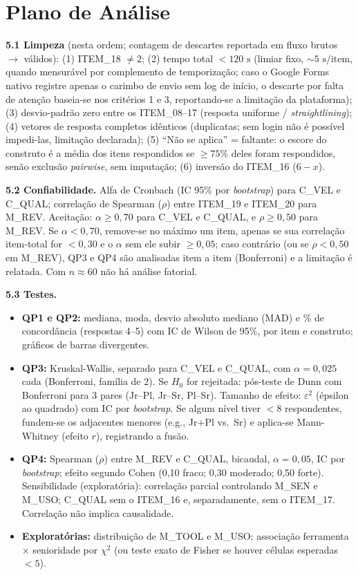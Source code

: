 \section{Plano de Análise}

\textbf{5.1 Limpeza} (nesta ordem; contagem de descartes reportada em fluxo brutos $\to$ válidos): (1) ITEM\_18 $\neq 2$; (2) tempo total $< 120\text{ s}$ (limiar fixo, $\sim 5\text{ s/item}$, quando mensurável por complemento de temporização; caso o Google Forms nativo registre apenas o carimbo de envio sem log de início, o descarte por falta de atenção baseia-se nos critérios 1 e 3, reportando-se a limitação da plataforma); (3) desvio-padrão zero entre os ITEM\_08--17 (resposta uniforme / \textit{straightlining}); (4) vetores de resposta completos idênticos (duplicatas; sem login não é possível impedi-las, limitação declarada); (5) \enquote{Não se aplica} = faltante: o escore do construto é a média dos itens respondidos se $\ge 75\%$ deles foram respondidos, senão exclusão \textit{pairwise}, sem imputação; (6) inversão do ITEM\_16 ($6 - x$).

\textbf{5.2 Confiabilidade.} Alfa de Cronbach (IC 95\% por \textit{bootstrap}) para C\_VEL e C\_QUAL; correlação de Spearman ($\rho$) entre ITEM\_19 e ITEM\_20 para M\_REV. Aceitação: $\alpha \ge 0{,}70$ para C\_VEL e C\_QUAL, e $\rho \ge 0{,}50$ para M\_REV. Se $\alpha < 0{,}70$, remove-se no máximo um item, apenas se sua correlação item-total for $< 0{,}30$ e o $\alpha$ sem ele subir $\ge 0{,}05$; caso contrário (ou se $\rho < 0{,}50$ em M\_REV), QP3 e QP4 são analisadas item a item (Bonferroni) e a limitação é relatada. Com $n \approx 60$ não há análise fatorial.

\textbf{5.3 Testes.}
\begin{itemize}
  \item \textbf{QP1 e QP2:} mediana, moda, desvio absoluto mediano (MAD) e \% de concordância (respostas 4--5) com IC de Wilson de 95\%, por item e construto; gráficos de barras divergentes.
  \item \textbf{QP3:} Kruskal-Wallis, separado para C\_VEL e C\_QUAL, com $\alpha = 0{,}025$ cada (Bonferroni, família de 2). Se $H_0$ for rejeitada: pós-teste de Dunn com Bonferroni para 3 pares (Jr--Pl, Jr--Sr, Pl--Sr). Tamanho de efeito: $\varepsilon^2$ (épsilon ao quadrado) com IC por \textit{bootstrap}. Se algum nível tiver $< 8$ respondentes, fundem-se os adjacentes menores (e.g., Jr+Pl vs.\ Sr) e aplica-se Mann-Whitney (efeito $r$), registrando a fusão.
  \item \textbf{QP4:} Spearman ($\rho$) entre M\_REV e C\_QUAL, bicaudal, $\alpha = 0{,}05$, IC por \textit{bootstrap}; efeito segundo Cohen (0,10 fraco; 0,30 moderado; 0,50 forte). Sensibilidade (exploratória): correlação parcial controlando M\_SEN e M\_USO; C\_QUAL sem o ITEM\_16 e, separadamente, sem o ITEM\_17. Correlação não implica causalidade.
  \item \textbf{Exploratórias:} distribuição de M\_TOOL e M\_USO; associação ferramenta $\times$ senioridade por $\chi^2$ (ou teste exato de Fisher se houver células esperadas $< 5$).
\end{itemize}

